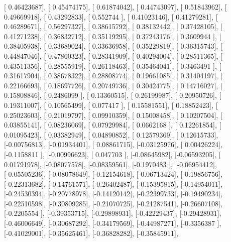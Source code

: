\documentclass{article}
\begin{document}
       [ 0.46423687],
       [ 0.45474175],
       [ 0.61874042],
       [ 0.44743097],
       [ 0.51843962],
       [ 0.49669918],
       [ 0.43292833],
       [ 0.552744  ],
       [ 0.41023146],
       [ 0.41279281],
       [ 0.46289671],
       [ 0.56297327],
       [ 0.38615792],
       [ 0.38132442],
       [ 0.37428105],
       [ 0.41271238],
       [ 0.36832712],
       [ 0.35119295],
       [ 0.37243176],
       [ 0.3609944 ],
       [ 0.38405938],
       [ 0.33689024],
       [ 0.33636958],
       [ 0.35229819],
       [ 0.36315743],
       [ 0.44847046],
       [ 0.47860323],
       [ 0.28341909],
       [ 0.40294004],
       [ 0.28511365],
       [ 0.43511356],
       [ 0.28555919],
       [ 0.26118463],
       [ 0.35464041],
       [ 0.3463491 ],
       [ 0.31617904],
       [ 0.38678322],
       [ 0.28808774],
       [ 0.19661085],
       [ 0.31404197],
       [ 0.22166693],
       [ 0.18697726],
       [ 0.20749736],
       [ 0.30424775],
       [ 0.14716027],
       [ 0.15808846],
       [ 0.2486099 ],
       [ 0.13360515],
       [ 0.26199987],
       [ 0.20950726],
       [ 0.19311007],
       [ 0.10565499],
       [ 0.077417  ],
       [ 0.15581551],
       [ 0.18852423],
       [ 0.25023603],
       [ 0.21019797],
       [ 0.09910359],
       [ 0.15008458],
       [ 0.10207504],
       [ 0.03855141],
       [ 0.08236069],
       [ 0.07929984],
       [ 0.0662168 ],
       [ 0.12261854],
       [ 0.01095423],
       [ 0.03382949],
       [ 0.04890852],
       [ 0.12579369],
       [ 0.12615733],
       [-0.00756813],
       [-0.01934401],
       [ 0.08861715],
       [-0.03125976],
       [ 0.00426224],
       [-0.1158811 ],
       [-0.00996623],
       [ 0.047703  ],
       [-0.08645982],
       [-0.06593205],
       [ 0.01791978],
       [-0.08077578],
       [-0.08359561],
       [-0.1970483 ],
       [-0.06954412],
       [-0.05505236],
       [-0.08078649],
       [-0.12154618],
       [-0.06713424],
       [-0.19856756],
       [-0.22313682],
       [-0.14761571],
       [-0.26402487],
       [-0.15395815],
       [-0.14954011],
       [-0.24530394],
       [-0.20778978],
       [-0.14120142],
       [-0.22399733],
       [-0.19490234],
       [-0.22510598],
       [-0.30809285],
       [-0.21070725],
       [-0.21287541],
       [-0.26607108],
       [-0.2205554 ],
       [-0.39353715],
       [-0.29898931],
       [-0.42229437],
       [-0.29428931],
       [-0.46006649],
       [-0.30687292],
       [-0.34179569],
       [-0.44987271],
       [-0.3356387 ],
       [-0.41029001],
       [-0.35625461],
       [-0.36828282],
       [-0.35845911],
\end{document}
